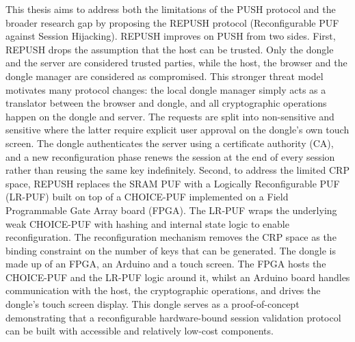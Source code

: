 This thesis aims to address both the limitations of the PUSH protocol and the broader research gap by proposing the REPUSH protocol (Reconfigurable PUF against Session Hijacking). REPUSH improves on PUSH from two sides. First, REPUSH drops the assumption that the host can be trusted. Only the dongle and the server are considered trusted parties, while the host, the browser and the dongle manager are considered as compromised. This stronger threat model motivates many protocol changes: the local dongle manager simply acts as a translator between the browser and dongle, and all cryptographic operations happen on the dongle and server. The requests are split into non-sensitive and sensitive where the latter require explicit user approval on the dongle's own touch screen. The dongle authenticates the server using a certificate authority (CA), and a new reconfiguration phase renews the session at the end of every session rather than reusing the same key indefinitely. Second, to address the limited CRP space, REPUSH replaces the SRAM PUF with a Logically Reconfigurable PUF (LR-PUF) \cite{10.1007/978-3-642-23951-9_25} built on top of a CHOICE-PUF \cite{9556423} implemented on a Field Programmable Gate Array board (FPGA). The LR-PUF wraps the underlying weak CHOICE-PUF with hashing and internal state logic to enable reconfiguration. The reconfiguration mechanism removes the CRP space as the binding constraint on the number of keys that can be generated. The dongle is made up of an FPGA, an Arduino and a touch screen. The FPGA hosts the CHOICE-PUF and the LR-PUF logic around it, whilst an Arduino board handles communication with the host, the cryptographic operations, and drives the dongle's touch screen display. This dongle serves as a proof-of-concept demonstrating that a reconfigurable hardware-bound session validation protocol can be built with accessible and relatively low-cost components. 

